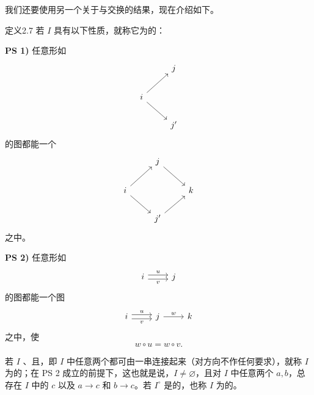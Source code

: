 我们还要使用另一个关于与交换的结果，现在介绍如下。
\begin{SGAresult}{定义}{2.7}
若 $I$ 具有以下性质，就称它为的：

\textbf{PS 1)} 任意形如
\[\begin{tikzcd}&j\\i\arrow[ur]\arrow[dr]&\\&j'\end{tikzcd}\]
的图都能一个
\[\begin{tikzcd}&j\arrow[dr]&\\ i\arrow[ur]\arrow[dr]&&k\\&j'\arrow[ur]&\end{tikzcd}\]
之中。

\textbf{PS 2)} 任意形如
\[\begin{tikzcd}i\arrow[r,shift left,"u"]\arrow[r,shift right,"v"']&j\end{tikzcd}\]
的图都能一个图
\[\begin{tikzcd}i\arrow[r,shift left,"u"]\arrow[r,shift right,"v"']&j\arrow[r,"w"]&k\end{tikzcd}\]
之中，使
\[w\circ u=w\circ v.\]
\end{SGAresult}
若 $I$ 、且，即 $I$ 中任意两个都可由一串连接起来（对方向不作任何要求），就称 $I$ 为的；在 PS 2 成立的前提下，这也就是说，$I\ne\varnothing$，且对 $I$ 中任意两个 $a,b$，总存在 $I$ 中的 $c$ 以及 $a\to c$ 和 $b\to c$。若 $I^\circ$ 是的，也称 $I$ 为的。

